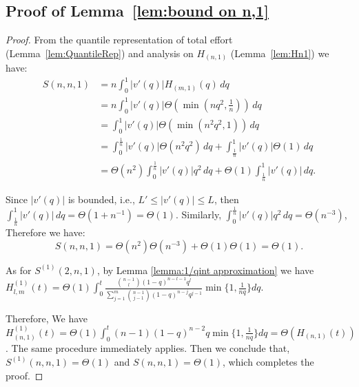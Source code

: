 \subsection*{Proof of Lemma~\ref{lem:bound on n,1}}
\begin{proof}
    From the quantile representation of total effort (Lemma~\ref{lem:QuantileRep}) and analysis on $H_{(n,1)}$ (Lemma~\ref{lem:Hn1}) we have:
    \[
    \begin{aligned}
        S(n,n,1) & = n\int_0^1|v'(q)|H_{(m,1)}(q)\,dq \\
        & = n\int_0^1|v'(q)| \Theta(\min(nq^2,\frac1{n}))\, dq \\
        &= \int_0^1|v'(q)| \Theta(\min(n^2q^2,1))\, dq \\
        &= \int_{0}^{\frac{1}{n}}|v'(q)| \Theta(n^2q^2)\, dq+\int_{\frac{1}{n}}^{1}|v'(q)| \Theta(1)\, dq \\
        &= \Theta(n^2)\int_{0}^{\frac{1}{n}}|v'(q)|q^2\, dq+\Theta(1)\int_{\frac{1}{n}}^{1}|v'(q)|\, dq.
    \end{aligned}
    \]
    
    Since $|v'(q)|$ is bounded, i.e., $L'\leq|v'(q)|\leq L$, then $\int_{\frac{1}{n}}^{1}|v'(q)|\, dq = \Theta(1+n^{-1}) = \Theta(1)$. Similarly, $\int_{0}^{\frac{1}{n}}|v'(q)|q^2\, dq=\Theta(n^{-3})$, Therefore we have:
    \[
    S(n,n,1)= \Theta(n^{2})\Theta(n^{-3})+\Theta(1)\Theta(1)=\Theta(1).
    \]

    As for $S^{(1)}(2,n,1)$, by Lemma \ref{lemma:1/qint approximation} we have 
$H_{l,m}^{(1)}(t)=\Theta(1)\int_0^t\frac{\binom{n-1}{l}(1-q)^{n-l-1}q^{l}}{\sum_{j=1}^{m}\binom{n-1}{j-1}(1-q)^{n-j}q^{j-1}}\min\{1,\frac{1}{nq}\}dq$.

    Therefore, We have $H_{(n,1)}^{(1)}(t)=\Theta(1)\int_0^t(n-1)(1-q)^{n-2}q\min\{1,\frac{1}{nq}\}dq=\Theta(H_{(n,1)}(t))$. The same procedure immediately applies. Then we conclude that, $S^{(1)}(n,n,1)=\Theta(1)$ and $S(n,n,1)=\Theta(1)$, which completes the proof.
\end{proof}

